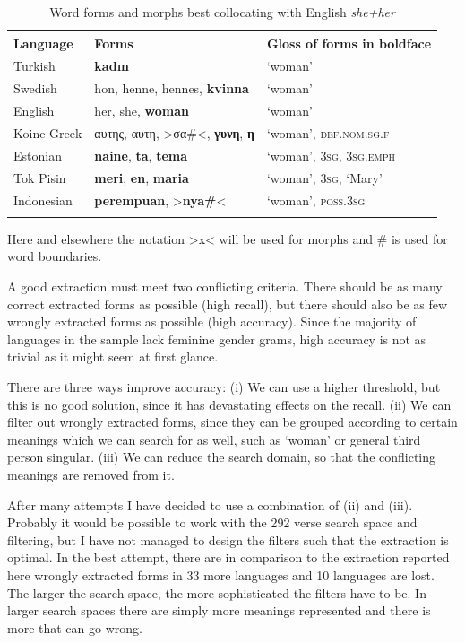 \documentclass[output=collectionpaper]{langsci/langscibook}
\begin{document}
\begin{table}
\begin{tabular}{lll}
\lsptoprule
  Language	&	Forms	&	Gloss of forms in boldface	\\
\midrule
  Turkish	&	\textbf{kadın}	&	‘woman’	\\
  Swedish	&	hon, henne, hennes, \textbf{kvinna}	&	‘woman’	\\
  English	&	her, she, \textbf{woman}	&	‘woman’	\\
  Koine Greek	&	αυτης, αυτη, >σα\#<, \textbf{γυνη}, \textbf{η}	&	‘woman’, \textsc{def.nom.sg.f}	\\
  Estonian	&	\textbf{naine}, \textbf{ta}, \textbf{tema}	&	‘woman’, \textsc{3sg}, \textsc{3sg.emph}	\\
  Tok Pisin	&	\textbf{meri}, \textbf{en}, \textbf{maria}	&	‘woman’, \textsc{3sg}, ‘Mary’	\\
  Indonesian	&	\textbf{perempuan}, >\textbf{nya\#}<	&	‘woman’, \textsc{poss.3sg}	\\
\lspbottomrule
\end{tabular}
\small{
\begin{flushleft}
Here and elsewhere the notation >x< will be used for morphs and \# is used for word boundaries.
\end{flushleft}
}%
\caption{Word forms and morphs best collocating with English \textit{she+her}}
\label{tab:BW:1}
\end{table}

A good extraction must meet two conflicting criteria. There should be as many correct extracted forms as possible (high recall), but there should also be as few wrongly extracted forms as possible (high accuracy). Since the majority of languages in the sample lack feminine gender grams, high accuracy is not as trivial as it might seem at first glance.

There are three ways improve accuracy: (i) We can use a higher threshold, but this is no good solution, since it has devastating effects on the recall. (ii) We can filter out wrongly extracted forms, since they can be grouped according to certain meanings which we can search for as well, such as ‘woman’ or general third person singular. (iii) We can reduce the search domain, so that the conflicting meanings are removed from it.

After many attempts I have decided to use a combination of (ii) and (iii). Probably it would be possible to work with the 292 verse search space and filtering, but I have not managed to design the filters such that the extraction is optimal. In the best attempt, there are in comparison to the extraction reported here wrongly extracted forms in 33 more languages and 10 languages are lost. The larger the search space, the more sophisticated the filters have to be. In larger search spaces there are simply more meanings represented and there is more that can go wrong.
\end{document}
